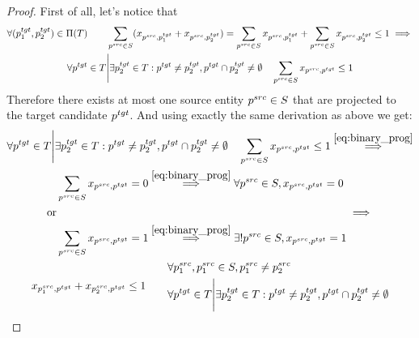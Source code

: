 \begin{proof}
    First of all, let's notice that
    \begin{multline*}
        \forall (p_1^{tgt}, p_2^{tgt}) \in \Pi(T)
        \qquad
        \sum\limits_{p^{src} \in S} (x_{p^{src}, p_1^{tgt}} + x_{p^{src}, p_2^{tgt}})
        =
        \sum\limits_{p^{src} \in S} x_{p^{src}, p_1^{tgt}} +
        \sum\limits_{p^{src} \in S} x_{p^{src}, p_2^{tgt}} \leq 1
        \implies                        \\
        \forall p^{tgt} \in T \Bigg| \exists p_2^{tgt} \in T: p^{tgt} \neq p_2^{tgt}, p^{tgt} \cap p_2^{tgt} \neq \emptyset
        \quad
        \sum\limits_{p^{src} \in S} x_{p^{src}, p^{tgt}} \leq 1
    \end{multline*}
    Therefore there exists at most one source entity \( p^{src} \in S \) that are projected
    to the target candidate \( p^{tgt} \).
    And using exactly the same derivation as above we get:
    \begin{multline*}
        \forall \tgt{p} \in T \Bigg| \exists \tgt{p_2} \in T: \tgt{p} \neq \tgt{p_2}, \tgt{p} \cap \tgt{p_2} \neq \emptyset
        \quad
        \sum\limits_{\src{p} \in S} x_{\src{p}, \tgt{p}} \leq 1
        \stackrel{\eqref{eq:binary_prog}}{\implies}                                                                                                                                                       \\
        \begin{aligned}
             & \sum\limits_{\src{p} \in S} x_{\src{p}, \tgt{p}} = 0
            \stackrel{\eqref{eq:binary_prog}}{\implies}
            \forall \src{p} \in S, x_{\src{p}, \tgt{p}} = 0         \\
            \text{or}                                               \\
             & \sum\limits_{\src{p} \in S} x_{\src{p}, \tgt{p}} = 1
            \stackrel{\eqref{eq:binary_prog}}{\implies}
            \exists! \src{p} \in S, x_{\src{p}, \tgt{p}} = 1        \\
        \end{aligned} \implies \\
        x_{\src{p_1}, \tgt{p}} + x_{\src{p_2}, \tgt{p}} \leq 1 \qquad
        \begin{aligned}
             & \forall \src{p_1}, \src{p_1} \in S, \src{p_1} \neq \src{p_2}                                                        \\
             & \forall \tgt{p} \in T \Bigg| \exists \tgt{p_2} \in T: \tgt{p} \neq \tgt{p_2}, \tgt{p} \cap \tgt{p_2} \neq \emptyset

\end{aligned}
\end{multline*}
\end{proof}
